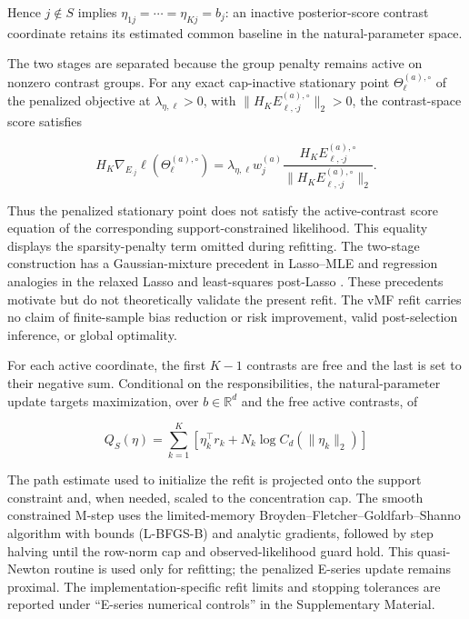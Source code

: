 \documentclass[preprint,12pt,authoryear]{elsarticle}
\newcounter{algorithm}
\begin{document}
Hence $j\notin S$ implies
$\eta_{1j}=\cdots=\eta_{Kj}=b_j$: an inactive posterior-score contrast coordinate
retains its estimated common baseline in the natural-parameter space.

The two stages are separated because the group penalty remains active on
nonzero contrast groups. For any exact cap-inactive stationary point
$\Theta_{\ell}^{(a),\circ}$ of the penalized objective at
$\lambda_{\eta,\ell}>0$, with
$\lVert H_KE_{\ell,\cdot j}^{(a),\circ}\rVert_2>0$, the contrast-space score
satisfies

\begin{equation}
\label{eq:active-penalized-score}
H_K\nabla_{E_{\cdot j}}\ell
\left(\Theta_{\ell}^{(a),\circ}\right)
=\lambda_{\eta,\ell}w_j^{(a)}
\frac{H_KE_{\ell,\cdot j}^{(a),\circ}}
{\lVert H_KE_{\ell,\cdot j}^{(a),\circ}\rVert_2}.
\end{equation}

Thus the penalized stationary point does not satisfy the active-contrast score
equation of the corresponding support-constrained likelihood. This equality
displays the sparsity-penalty term omitted during refitting. The two-stage
construction has a Gaussian-mixture precedent in Lasso--MLE
\citep{meynet2012thesis,meynet2012sparse} and regression analogies in the
relaxed Lasso and least-squares post-Lasso
\citep{meinshausen2007relaxed,belloni2013postlasso}. These precedents motivate
but do not theoretically validate the present refit. The vMF refit carries no
claim of finite-sample bias reduction or risk improvement, valid post-selection
inference, or global optimality.

For each active coordinate, the first $K-1$ contrasts are free and the last is
set to their negative sum. Conditional on the responsibilities, the
natural-parameter update targets maximization, over $b\in\mathbb R^d$ and the
free active contrasts, of

\begin{equation}
\label{eq:refit-q}
Q_S(\eta)
=\sum_{k=1}^K
\left[
\eta_k^\top r_k
+N_k\log C_d(\lVert\eta_k\rVert_2)
\right]
\end{equation}

The path estimate used to initialize the refit is projected onto the support
constraint and, when needed, scaled to the concentration cap. The smooth
constrained M-step uses the
limited-memory Broyden--Fletcher--Goldfarb--Shanno algorithm with bounds
(L-BFGS-B) \citep{byrd1995lbfgsb} and analytic gradients, followed by step
halving until the row-norm cap and observed-likelihood guard hold. This
quasi-Newton routine is used only for refitting; the penalized E-series update
remains proximal. The implementation-specific refit limits and stopping
tolerances are reported under ``E-series numerical controls'' in the
Supplementary Material.
\end{document}
